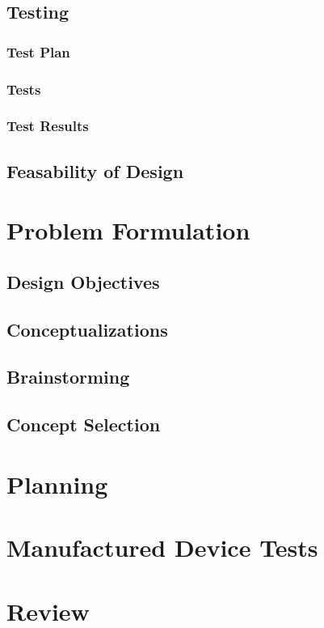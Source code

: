 \documentclass{article}
\begin{document}
\subsection{Testing}
\subsubsection{Test Plan}


\pagebreak

\subsubsection{Tests}


\subsubsection{Test Results}


\subsection{Feasability of Design} %



\newpage
\appendix
\appendixpage

\section{Problem Formulation}
\subsection{Design Objectives}


\subsection{Conceptualizations}

\subsection{Brainstorming}

\subsection{Concept Selection}

\pagebreak

\section{Planning}

\pagebreak

\section{Manufactured Device Tests}


\section{Review}
\end{document}
